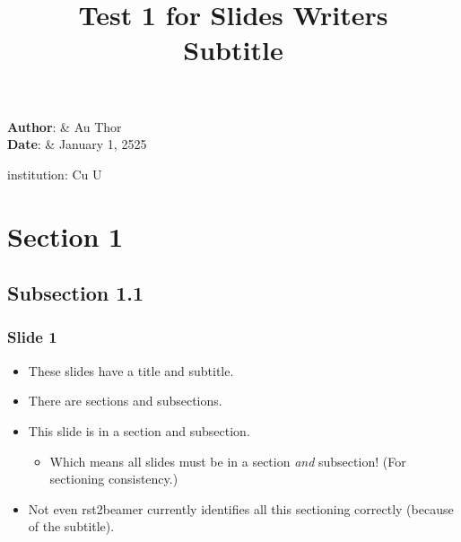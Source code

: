 \documentclass[t,english]{beamer}
\begin{document}
\title{Test 1 for Slides Writers%
  \label{test-1-for-slides-writers}%
  \\ %
  \large{Subtitle}%
  \label{subtitle}}
\author{}
\date{}
\maketitle
\textbf{Author}: &
	Au Thor \\
\textbf{Date}: &
	January 1, 2525 \\
\item[{institution:}]
Cu U




\section*{Section 1}



\subsection*{Subsection 1.1}

\begin{frame}[fragile]
\frametitle{Slide 1}

\begin{itemize}[<+-| alert@+>]

\item These slides have a title and subtitle.

\item There are sections and subsections.

\item This slide is in a section and subsection.
\begin{itemize}[<+-| alert@+>]

\item Which means all slides must be in a section
\emph{and} subsection! (For sectioning consistency.)
\end{itemize}

\item Not even rst2beamer currently identifies all this
sectioning correctly (because of the subtitle).
\end{itemize}
\end{frame}


\end{document}
